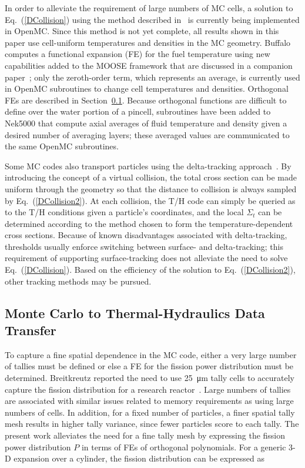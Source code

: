 \documentclass[letterpaper]{physor2018}
\begin{document}
In order to alleviate the requirement of large numbers of MC cells, a solution to Eq.~(\ref{DCollision})
using the method described in~\cite{Brown} is currently being implemented
in OpenMC.
Since this method is not yet complete,
all results shown in this paper use cell-uniform temperatures and densities in the MC geometry.
Buffalo computes a functional expansion (FE)
for the fuel temperature using
new capabilities added to the MOOSE framework that are discussed in
a companion paper~\cite{Wendt}; only the zeroth-order
term, which represents an average, is currently used in OpenMC
subroutines to change cell temperatures and
densities. Orthogonal FEs
are described in Section~\ref{sec:MCtoTH}. Because orthogonal functions are difficult
to define over the water portion
of a pincell, subroutines have been added to Nek5000 that
compute axial averages of fluid
temperature and density given a desired number of averaging layers; these averaged
values are communicated to the same OpenMC
subroutines.

Some MC codes also transport particles
using the delta-tracking approach~\cite{Leppanen}.
By introducing the concept of a virtual collision, the total cross section can
be made uniform through the geometry so that the distance to collision
is always sampled by Eq.~(\ref{DCollision2}).
At each collision, the T/H code can simply be queried as to the T/H conditions
given a particle's coordinates,
and the local \(\Sigma_t\) can be determined according to the
method chosen to form the temperature-dependent
cross sections.
Because of known disadvantages associated with delta-tracking, 
thresholds usually enforce switching between surface- and delta-tracking;
this requirement of supporting surface-tracking
does not alleviate the need to solve Eq.~(\ref{DCollision}).
Based on the efficiency of the solution to Eq.~(\ref{DCollision2}), other tracking methods may be pursued.

\subsection{Monte Carlo to Thermal-Hydraulics Data Transfer}
\label{sec:MCtoTH}
To capture a fine spatial dependence in the MC code,
either a very large number of tallies must be defined
or else a FE for the fission power distribution must be determined.
Breitkreutz reported the need to use \SI{25}{\micro\meter} tally
cells to accurately capture the fission distribution for a research reactor~\cite{Breitkreutz}.
Large numbers of tallies are associated with similar issues related to memory requirements
as using large numbers of cells. In addition, for a fixed number of particles,
a finer spatial tally mesh results in higher tally variance,
since fewer particles score to each tally.
The present work alleviates the need for a fine tally mesh by
expressing the fission power distribution \(P\)
in terms of FEs of orthogonal polynomials. For a generic 3-D expansion over a
cylinder, the fission distribution can be expressed as
\end{document}
